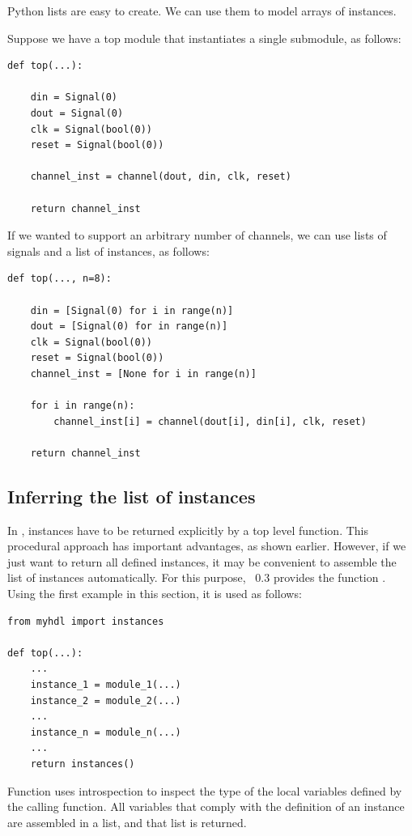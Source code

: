 Python lists are easy to create. We can use them
to model arrays of instances. 

Suppose we have a top module that instantiates a
single  submodule, as follows:

\begin{verbatim}
def top(...):

    din = Signal(0)
    dout = Signal(0)
    clk = Signal(bool(0))
    reset = Signal(bool(0))

    channel_inst = channel(dout, din, clk, reset)

    return channel_inst 
\end{verbatim}

If we wanted to support an arbitrary number of channels,
we can use lists of signals and a list of instances,
as follows:

\begin{verbatim}
def top(..., n=8):

    din = [Signal(0) for i in range(n)]
    dout = [Signal(0) for in range(n)]
    clk = Signal(bool(0))
    reset = Signal(bool(0))
    channel_inst = [None for i in range(n)]

    for i in range(n):
        channel_inst[i] = channel(dout[i], din[i], clk, reset)

    return channel_inst
\end{verbatim}

\subsection{Inferring the list of instances \label{model-infer-instlist}}

In \myhdl{}, instances have to be returned explicitly by
a top level function. This procedural approach has important
advantages, as shown earlier. However, if we just want to
return all defined instances, it may be convenient to assemble 
the list of instances automatically. For this purpose,
\myhdl{}~0.3 provides the function .
Using the first example in this section, it is used as follows:

\begin{verbatim}
from myhdl import instances

def top(...):
    ...
    instance_1 = module_1(...)
    instance_2 = module_2(...)
    ...
    instance_n = module_n(...)
    ...
    return instances()
\end{verbatim}

Function  uses introspection to inspect the type
of the local variables defined by the calling function. All variables
that comply with the definition of an instance are assembled in
a list, and that list is returned.


